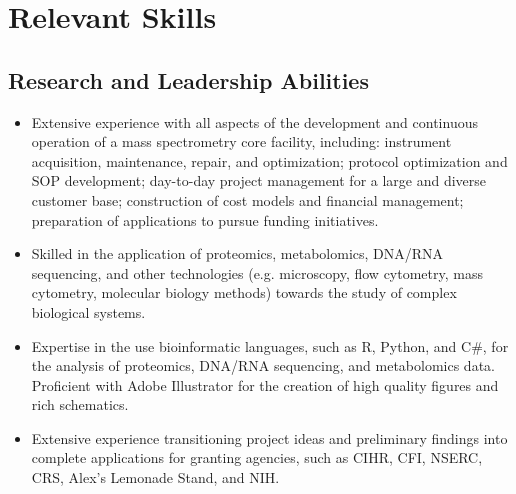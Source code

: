 \documentclass[11pt]{article}
\begin{document}
\section*{Relevant Skills}
\begin{addmargin}[3em]{2em}%
	\subsection*{Research and Leadership Abilities}
	\begin{itemize}
		\item Extensive experience with all aspects of the development and continuous operation of a mass spectrometry core facility, including: instrument acquisition, maintenance, repair, and optimization; protocol optimization and SOP development; day-to-day project management for a large and diverse customer base; construction of cost models and financial management; preparation of applications to pursue funding initiatives. 
        \item Skilled in the application of proteomics, metabolomics, DNA/RNA sequencing, and other technologies (e.g. microscopy, flow cytometry, mass cytometry, molecular biology methods) towards the study of complex biological systems.
        \item Expertise in the use bioinformatic languages, such as R, Python, and C\#, for the analysis of proteomics, DNA/RNA sequencing, and metabolomics data. Proficient with Adobe Illustrator for the creation of high quality figures and rich schematics.
        \item Extensive experience transitioning project ideas and preliminary findings into complete applications for granting agencies, such as CIHR, CFI, NSERC, CRS, Alex's Lemonade Stand, and NIH.		
	\end{itemize}
\end{addmargin}
\end{document}
